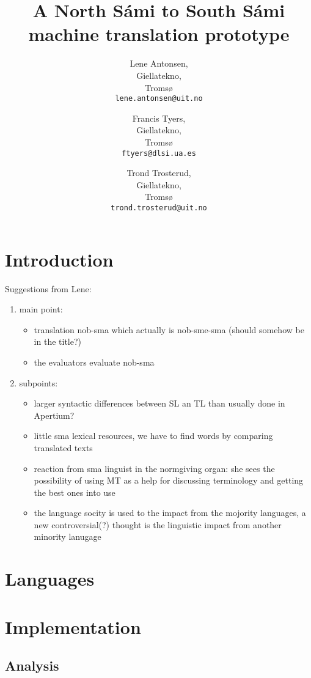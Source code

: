 \documentclass[a4paper,11pt,twocolumn]{article}
\title{A North Sámi to South Sámi machine translation prototype}
\author{Lene Antonsen,\\Giellatekno,\\Tromsø\\{\tt lene.antonsen@uit.no}
\and Francis Tyers,\\Giellatekno,\\Tromsø\\{\tt ftyers@dlsi.ua.es}
\and Trond Trosterud,\\Giellatekno,\\Tromsø\\{\tt trond.trosterud@uit.no}}
\date{}
\begin{document}
\maketitle

\section{Introduction}
Suggestions from Lene:  
\begin{enumerate}
\item main point: 
\begin{itemize}
\item translation nob-sma which actually is nob-sme-sma (should somehow be in the title?) 
\item the evaluators evaluate nob-sma
\end{itemize}
\item subpoints: 
\begin{itemize}
\item larger syntactic differences between SL an TL than usually done in Apertium?
\item little sma lexical resources, we have to find words by comparing translated texts
\item reaction from sma linguist in the normgiving organ: she sees the possibility of using MT as a help for discussing terminology and getting the best ones into use
\item the language socity is used to the impact from the mojority languages, a new controversial(?) thought is the linguistic impact from another minority lanugage 
\end{itemize}
\end{enumerate}


\cite{tyers09} \cite{wiechetek10} \cite{trosterud12}

\section{Languages}


\section{Implementation}


\subsection{Analysis}
\end{document}
